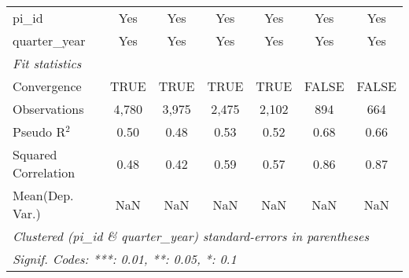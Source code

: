 \begin{tabular}{lcccccc}
   pi\_id                                                     & Yes           & Yes           & Yes           & Yes           & Yes            & Yes\\  
   quarter\_year                                              & Yes           & Yes           & Yes           & Yes           & Yes            & Yes\\  
   \midrule
   \emph{Fit statistics}\\
   Convergence                                                &TRUE           & TRUE          & TRUE          & TRUE          & FALSE          & FALSE\\  
   Observations                                               & 4,780         & 3,975         & 2,475         & 2,102         & 894            & 664\\  
   Pseudo R$^2$                                               & 0.50          & 0.48          & 0.53          & 0.52          & 0.68           & 0.66\\  
   Squared Correlation                                        & 0.48          & 0.42          & 0.59          & 0.57          & 0.86           & 0.87\\  
Mean(Dep. Var.) & NaN & NaN & NaN & NaN & NaN & NaN \\
   \midrule \midrule
   \multicolumn{7}{l}{\emph{Clustered (pi\_id \& quarter\_year) standard-errors in parentheses}}\\
   \multicolumn{7}{l}{\emph{Signif. Codes: ***: 0.01, **: 0.05, *: 0.1}}\\
\end{tabular}
\par\endgroup
